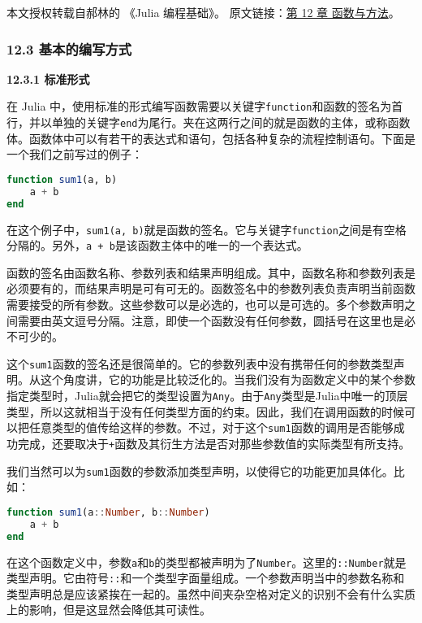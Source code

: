 
本文授权转载自郝林的 《Julia 编程基础》。 原文链接：\href{https://github.com/hyper0x/JuliaBasics/blob/master/book/ch12.md}{第 12 章 函数与方法}。

\subsubsection{12.3 基本的编写方式}

\textbf{12.3.1 标准形式}

在 Julia 中，使用标准的形式编写函数需要以关键字\verb`function`和函数的签名为首行，并以单独的关键字\verb`end`为尾行。夹在这两行之间的就是函数的主体，或称函数体。函数体中可以有若干的表达式和语句，包括各种复杂的流程控制语句。下面是一个我们之前写过的例子：

\begin{lstlisting}[language=julia]
function sum1(a, b)
    a + b
end
\end{lstlisting}

在这个例子中，\verb`sum1(a, b)`就是函数的签名。它与关键字\verb`function`之间是有空格分隔的。另外，\verb`a + b`是该函数主体中的唯一的一个表达式。

函数的签名由函数名称、参数列表和结果声明组成。其中，函数名称和参数列表是必须要有的，而结果声明是可有可无的。函数签名中的参数列表负责声明当前函数需要接受的所有参数。这些参数可以是必选的，也可以是可选的。多个参数声明之间需要由英文逗号分隔。注意，即使一个函数没有任何参数，圆括号在这里也是必不可少的。

这个\verb`sum1`函数的签名还是很简单的。它的参数列表中没有携带任何的参数类型声明。从这个角度讲，它的功能是比较泛化的。当我们没有为函数定义中的某个参数指定类型时，Julia就会把它的类型设置为\verb`Any`。由于\verb`Any`类型是Julia中唯一的顶层类型，所以这就相当于没有任何类型方面的约束。因此，我们在调用函数的时候可以把任意类型的值传给这样的参数。不过，对于这个\verb`sum1`函数的调用是否能够成功完成，还要取决于\verb`+`函数及其衍生方法是否对那些参数值的实际类型有所支持。

我们当然可以为\verb`sum1`函数的参数添加类型声明，以使得它的功能更加具体化。比如：

\begin{lstlisting}[language=julia]
function sum1(a::Number, b::Number)
    a + b
end
\end{lstlisting}

在这个函数定义中，参数\verb`a`和\verb`b`的类型都被声明为了\verb`Number`。这里的\verb`::Number`就是类型声明。它由符号\verb`::`和一个类型字面量组成。一个参数声明当中的参数名称和类型声明总是应该紧挨在一起的。虽然中间夹杂空格对定义的识别不会有什么实质上的影响，但是这显然会降低其可读性。


